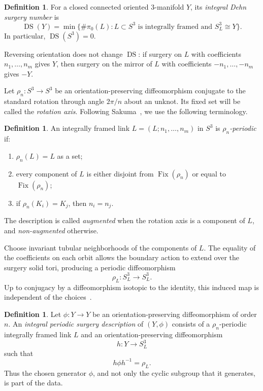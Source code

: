 \documentclass[11pt]{amsart}
\newcommand{\DS}{\operatorname{DS}}
\newcommand{\Fix}{\operatorname{Fix}}
\theoremstyle{definition}
\newtheorem{definition}[theorem]{Definition}
\theoremstyle{remark}
\begin{document}
\begin{definition}
For a closed connected oriented $3$-manifold $Y$, its \emph{integral Dehn surgery number} is
\[
   \DS(Y)=\min\bigl\{\#\pi_0(L):L\subset S^3
   \text{ is integrally framed and }S^3_L\cong Y\bigr\}.
\]
In particular, $\DS(S^3)=0$.
\end{definition}

Reversing orientation does not change $\DS$: if surgery on $L$ with coefficients $n_1,\dots,n_m$ gives $Y$, then surgery on the mirror of $L$ with coefficients $-n_1,\dots,-n_m$ gives $-Y$.

Let $\rho_n\colon S^3\to S^3$ be an orientation-preserving diffeomorphism conjugate to the standard rotation through angle $2\pi/n$ about an unknot. Its fixed set will be called the \emph{rotation axis}. Following Sakuma~\cite{Sakuma}, we use the following terminology.

\begin{definition}
An integrally framed link $L=(L;n_1,\dots,n_m)$ in $S^3$ is \emph{$\rho_n$-periodic} if:
\begin{enumerate}
\item $\rho_n(L)=L$ as a set;
\item every component of $L$ is either disjoint from $\Fix(\rho_n)$ or equal to $\Fix(\rho_n)$;
\item if $\rho_n(K_i)=K_j$, then $n_i=n_j$.
\end{enumerate}
The description is called \emph{augmented} when the rotation axis is a component of $L$, and \emph{non-augmented} otherwise.
\end{definition}

Choose invariant tubular neighborhoods of the components of $L$. The equality of the coefficients on each orbit allows the boundary action to extend over the surgery solid tori, producing a periodic diffeomorphism
\[
   \rho_L\colon S^3_L\longrightarrow S^3_L.
\]
Up to conjugacy by a diffeomorphism isotopic to the identity, this induced map is independent of the choices~\cite[Section~2]{Sakuma}.

\begin{definition}
Let $\phi\colon Y\to Y$ be an orientation-preserving diffeomorphism of order $n$. An \emph{integral periodic surgery description} of $(Y,\phi)$ consists of a $\rho_n$-periodic integrally framed link $L$ and an orientation-preserving diffeomorphism
\[
   h\colon Y\longrightarrow S^3_L
\]
such that
\[
   h\phi h^{-1}=\rho_L.
\]
Thus the chosen generator $\phi$, and not only the cyclic subgroup that it generates, is part of the data.
\end{definition}
\end{document}
